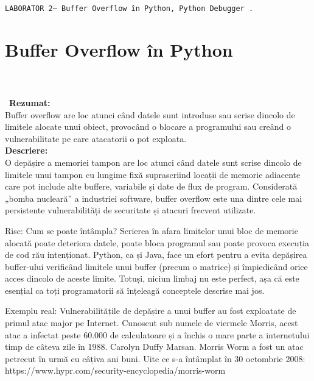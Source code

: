 \documentclass[oneside,20pt]{article}          %
\begin{document}

\noindent 
\begin{center}
  \texttt{LABORATOR 2-- Buffer Overflow în Python, Python Debugger .}        
\end{center}

\section{Buffer Overflow în Python}
\noindent                 
\\\\\
\textbf{Rezumat:}\\
Buffer overflow are loc atunci când datele sunt introduse sau scrise dincolo de limitele alocate unui obiect, provocând o blocare a programului sau creând o vulnerabilitate pe care atacatorii o pot exploata.\\

\textbf{Descriere:}\\
O depășire a memoriei tampon are loc atunci când datele sunt scrise dincolo de limitele unui tampon cu lungime fixă ​​suprascriind locații de memorie adiacente care pot include alte buffere, variabile și date de flux de program. Considerată „bomba nucleară” a industriei software, buffer overflow este una dintre cele mai persistente vulnerabilități de securitate și atacuri frecvent utilizate.  

Risc: Cum se poate întâmpla?
Scrierea în afara limitelor unui bloc de memorie alocată poate deteriora datele, poate bloca programul sau poate provoca execuția de cod rău intenționat. Python, ca și Java, face un efort pentru a evita depășirea buffer-ului verificând limitele unui buffer (precum o matrice) și împiedicând orice acces dincolo de aceste limite. Totuși, niciun limbaj nu este perfect, așa că este esențial ca toți programatorii să înțeleagă conceptele descrise mai jos.

Exemplu real:
Vulnerabilitățile de depășire a unui buffer au fost exploatate de primul atac major pe Internet. Cunoscut sub numele de viermele Morris, acest atac a infectat peste 60.000 de calculatoare și a închis o mare parte a internetului timp de câteva zile în 1988.
Carolyn Duffy Marsan. Morris Worm a fost un atac petrecut în urmă cu câțiva ani buni. Uite ce s-a întâmplat în 30 octombrie 2008:\\ 
https://www.hypr.com/security-encyclopedia/morris-worm\\
\end{document}
